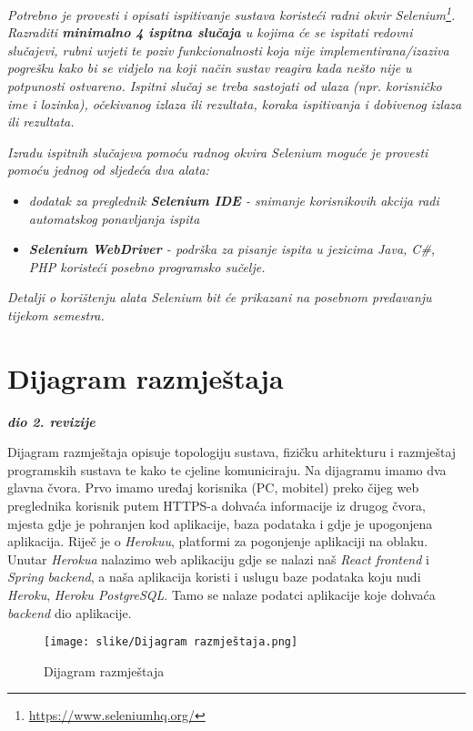 			 \textit{Potrebno je provesti i opisati ispitivanje sustava koristeći radni okvir Selenium\footnote{\url{https://www.seleniumhq.org/}}. Razraditi \textbf{minimalno 4 ispitna slučaja} u kojima će se ispitati redovni slučajevi, rubni uvjeti te poziv funkcionalnosti koja nije implementirana/izaziva pogrešku kako bi se vidjelo na koji način sustav reagira kada nešto nije u potpunosti ostvareno. Ispitni slučaj se treba sastojati od ulaza (npr. korisničko ime i lozinka), očekivanog izlaza ili rezultata, koraka ispitivanja i dobivenog izlaza ili rezultata.\\ }
			 
			 \textit{Izradu ispitnih slučajeva pomoću radnog okvira Selenium moguće je provesti pomoću jednog od sljedeća dva alata:}
			 \begin{itemize}
			 	\item \textit{dodatak za preglednik \textbf{Selenium IDE} - snimanje korisnikovih akcija radi automatskog ponavljanja ispita	}
			 	\item \textit{\textbf{Selenium WebDriver} - podrška za pisanje ispita u jezicima Java, C\#, PHP koristeći posebno programsko sučelje.}
			 \end{itemize}
		 	\textit{Detalji o korištenju alata Selenium bit će prikazani na posebnom predavanju tijekom semestra.}
			
			\eject 
		
		
		\section{Dijagram razmještaja}
			
			\textbf{\textit{dio 2. revizije}}
			
			Dijagram razmještaja opisuje topologiju sustava, fizičku arhitekturu i razmještaj programskih sustava te kako te cjeline komuniciraju. Na dijagramu imamo dva glavna čvora. Prvo imamo uređaj korisnika (PC, mobitel) preko čijeg web preglednika korisnik putem HTTPS-a dohvaća informacije iz drugog čvora, mjesta gdje je pohranjen kod aplikacije, baza podataka i gdje je upogonjena aplikacija. Riječ je o \textit{Herokuu}, platformi za pogonjenje aplikaciji na oblaku. Unutar \textit{Herokua} nalazimo web aplikaciju gdje se nalazi naš \textit{React frontend} i \textit{Spring backend}, a naša aplikacija koristi i uslugu baze podataka koju nudi \textit{Heroku}, \textit{Heroku PostgreSQL}. Tamo se nalaze podatci aplikacije koje dohvaća \textit{backend} dio aplikacije.

            \begin{figure}[H]
             \centering
             \texttt{[image: slike/Dijagram razmještaja.png]}
             \caption{Dijagram razmještaja}
             \end{figure}
			\eject
		
